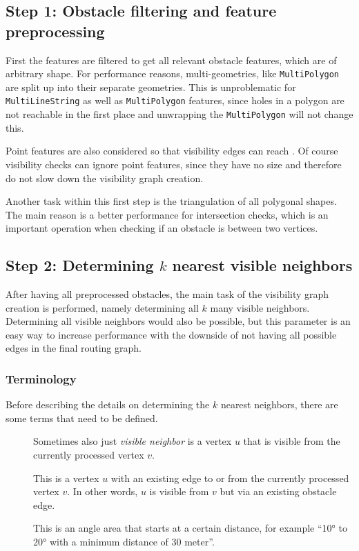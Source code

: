 	\subsection{Step 1: Obstacle filtering and feature preprocessing}
	\label{subsec:step-1-preprocessing}
			
			First the features are filtered to get all relevant obstacle features, which are of arbitrary shape.
			For performance reasons, multi-geometries, like \texttt{MultiPolygon} are split up into their separate geometries.
			This is unproblematic for \texttt{MultiLineString} as well as \texttt{MultiPolygon} features, since holes in a polygon are not reachable in the first place and unwrapping the \texttt{MultiPolygon} will not change this.
			
			Point features are also considered so that visibility edges can reach .
			Of course visibility checks can ignore point features, since they have no size and therefore do not slow down the visibility graph creation.
			
			Another task within this first step is the triangulation of all polygonal shapes.
			The main reason is a better performance for intersection checks, which is an important operation when checking if an obstacle is between two vertices.
			
	\subsection{Step 2: Determining $k$ nearest visible neighbors}
			
			After having all preprocessed obstacles, the main task of the visibility graph creation is performed, namely determining all $k$ many visible neighbors.
			Determining all visible neighbors would also be possible, but this parameter is an easy way to increase performance with the downside of not having all possible edges in the final routing graph.
			
			\subsubsection{Terminology}
			
				Before describing the details on determining the $k$ nearest neighbors, there are some terms that need to be defined.
				
				\begin{description}
					\item[] Sometimes also just \emph{visible neighbor} is a vertex $u$ that is visible from the currently processed vertex $v$.
					\item[] This is a vertex $u$ with an existing edge to or from the currently processed vertex $v$. In other words, $u$ is visible from $v$ but via an existing obstacle edge.
					\item[] This is an angle area that starts at a certain distance, for example \enquote{10° to 20° with a minimum distance of 30 meter}.
				\end{description}
			
